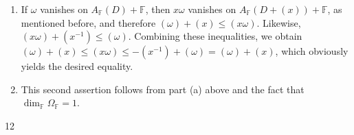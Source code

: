 \documentclass[11pt]{article}
\theoremstyle{scplain}
\begin{document}
\begin{enumerate}
\item[(a)] If $\omega$ vanishes on $A_{\mathbb{F}}(D)+\mathbb{F}$, then
$x\omega$ vanishes on $A_{\mathbb{F}}(D+(x))+\mathbb{F}$, as mentioned before,
and therefore $(\omega)+(x) \leq (x\omega)$. Likewise,
$(x\omega)+(x^{-1}) \leq (\omega)$. Combining these inequalities, we obtain
$(\omega)+(x) \leq (x\omega) \leq -(x^{-1})+(\omega)=(\omega)+(x)$, which
obviously yields the desired equality.

\item[(b)] This second assertion follows from part (a) above and the fact that
$\dim_{\mathbb{F}}\Omega_{\mathbb{F}}=1$.
\end{enumerate}

\begin{center}12\end{center}
\end{document}

